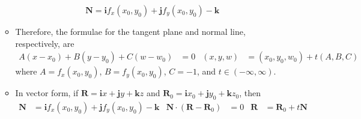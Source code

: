 \documentclass[../main.tex]{subfiles}
\begin{document}
\begin{itemize}
\begin{itemize}
\begin{equation*}
            \textbf{N} = \textbf{i}f_x(x_0,y_0)+\textbf{j}f_y(x_0,y_0)-\textbf{k}
        \end{equation*}
        \item Therefore, the formulae for the tangent plane and normal line, respectively, are
        \begin{align*}
            A(x-x_0)+B(y-y_0)+C(w-w_0) &= 0&
                (x,y,w) &= (x_0,y_0,w_0)+t(A,B,C)
        \end{align*}
        where $A=f_x(x_0,y_0)$, $B=f_y(x_0,y_0)$, $C=-1$, and $t\in(-\infty,\infty)$.
        \item In vector form, if $\textbf{R}=\textbf{i}x+\textbf{j}y+\textbf{k}z$ and $\textbf{R}_0=\textbf{i}x_0+\textbf{j}y_0+\textbf{k}z_0$, then
        \begin{align*}
            \textbf{N} &= \textbf{i}f_x(x_0,y_0)+\textbf{j}f_y(x_0,y_0)-\textbf{k}&
                \textbf{N}\cdot(\textbf{R}-\textbf{R}_0) &= 0&
                    \textbf{R} &= \textbf{R}_0+t\textbf{N}
        \end{align*}
    \end{itemize}
\end{itemize}
\end{document}
